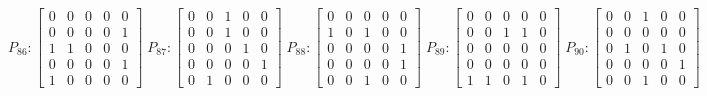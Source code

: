     $$
        P_{86} : \begin{bmatrix}
            0 & 0 & 0 & 0 & 0 \\
            0 & 0 & 0 & 0 & 1 \\
            1 & 1 & 0 & 0 & 0 \\
            0 & 0 & 0 & 0 & 1 \\
            1 & 0 & 0 & 0 & 0
        \end{bmatrix}
        \;
        P_{87} : \begin{bmatrix}
            0 & 0 & 1 & 0 & 0 \\
            0 & 0 & 1 & 0 & 0 \\
            0 & 0 & 0 & 1 & 0 \\
            0 & 0 & 0 & 0 & 1 \\
            0 & 1 & 0 & 0 & 0
        \end{bmatrix}
        \;
        P_{88} : \begin{bmatrix}
            0 & 0 & 0 & 0 & 0 \\
            1 & 0 & 1 & 0 & 0 \\
            0 & 0 & 0 & 0 & 1 \\
            0 & 0 & 0 & 0 & 1 \\
            0 & 0 & 1 & 0 & 0
        \end{bmatrix}
        \;
        P_{89} : \begin{bmatrix}
            0 & 0 & 0 & 0 & 0 \\
            0 & 0 & 1 & 1 & 0 \\
            0 & 0 & 0 & 0 & 0 \\
            0 & 0 & 0 & 0 & 0 \\
            1 & 1 & 0 & 1 & 0
        \end{bmatrix}
        \; 
        P_{90} : \begin{bmatrix}
            0 & 0 & 1 & 0 & 0 \\
            0 & 0 & 0 & 0 & 0 \\
            0 & 1 & 0 & 1 & 0 \\
            0 & 0 & 0 & 0 & 1 \\
            0 & 0 & 1 & 0 & 0
        \end{bmatrix}
    $$

